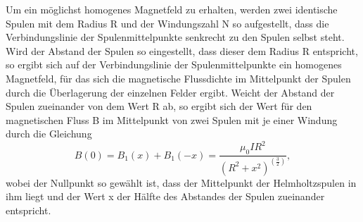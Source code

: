 Um ein möglichst homogenes Magnetfeld zu erhalten, werden zwei identische Spulen mit dem Radius R und der Windungszahl N 
so aufgestellt, dass die Verbindungslinie der Spulenmittelpunkte senkrecht zu den Spulen selbst steht. Wird der Abstand 
der Spulen so eingestellt, dass dieser dem Radius R entspricht, so ergibt sich auf der Verbindungslinie der 
Spulenmittelpunkte ein homogenes Magnetfeld, für das sich die magnetische Flussdichte im Mittelpunkt der Spulen durch
die Überlagerung der einzelnen Felder ergibt. 
Weicht der Abstand der Spulen zueinander von dem Wert R ab, so ergibt sich der Wert für den magnetischen Fluss B im 
Mittelpunkt von zwei Spulen mit je einer Windung durch die Gleichung
\begin{equation}
    B(0) = B_1(x) + B_1(-x) = \frac{\mu_0 I R^2}{(R^2 + x^2)^(\frac{3}{2})},
\end{equation}
\noindent
wobei der Nullpunkt so gewählt ist, dass der Mittelpunkt der Helmholtzspulen in ihm liegt und der Wert x 
der Hälfte des Abstandes der Spulen zueinander entspricht.

